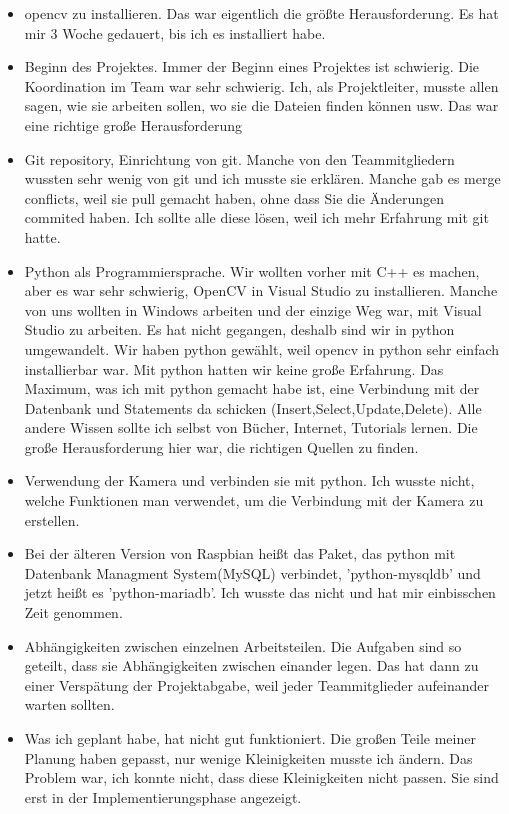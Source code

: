 \begin{itemize}
	\item opencv zu installieren. Das war eigentlich die größte Herausforderung. Es hat mir 3 Woche gedauert, bis ich es installiert habe. 
	
	\item Beginn des Projektes. Immer der Beginn eines Projektes ist schwierig. Die Koordination im Team war sehr schwierig. Ich, als Projektleiter, musste allen sagen, wie sie arbeiten sollen, wo sie die Dateien finden können usw. Das war eine richtige große Herausforderung
	
	\item Git repository, Einrichtung von git. Manche von den Teammitgliedern wussten sehr wenig von git und ich musste sie erklären. Manche gab es merge conflicts, weil sie pull gemacht haben, ohne dass Sie die Änderungen commited haben. Ich sollte alle diese lösen, weil ich mehr Erfahrung mit git hatte. 
	
	\item Python als Programmiersprache. Wir wollten vorher mit C++ es machen, aber es war sehr schwierig, OpenCV in Visual Studio zu installieren. Manche von uns wollten in Windows arbeiten und der einzige Weg war, mit Visual Studio zu arbeiten. Es hat nicht gegangen, deshalb sind wir in python umgewandelt. Wir haben python gewählt, weil opencv in python sehr einfach installierbar war. Mit python hatten wir keine große Erfahrung. Das Maximum, was ich mit python gemacht habe ist, eine Verbindung mit der Datenbank und Statements da schicken (Insert,Select,Update,Delete). Alle andere Wissen sollte ich selbst von Bücher, Internet, Tutorials lernen. Die große Herausforderung hier war, die richtigen Quellen zu finden.
	
	\item Verwendung der Kamera und verbinden sie mit python. Ich wusste nicht, welche Funktionen man verwendet, um die Verbindung mit der Kamera zu erstellen. 
	\item Bei der älteren Version von Raspbian heißt das Paket, das python mit Datenbank Managment System(MySQL) verbindet, 'python-mysqldb' und jetzt heißt es 'python-mariadb'. Ich wusste das nicht und hat mir einbisschen Zeit genommen. 
	\item Abhängigkeiten zwischen einzelnen Arbeitsteilen. Die Aufgaben sind so geteilt, dass sie Abhängigkeiten zwischen einander legen. Das hat dann zu einer Verspätung der Projektabgabe, weil jeder Teammitglieder aufeinander warten sollten. 
	\item Was ich geplant habe, hat nicht gut funktioniert. Die großen Teile meiner Planung haben gepasst, nur wenige Kleinigkeiten musste ich ändern. Das Problem war, ich konnte nicht, dass diese Kleinigkeiten nicht passen. Sie sind erst in der Implementierungsphase 
	angezeigt.
	\\
	\\
	

\end{itemize}
